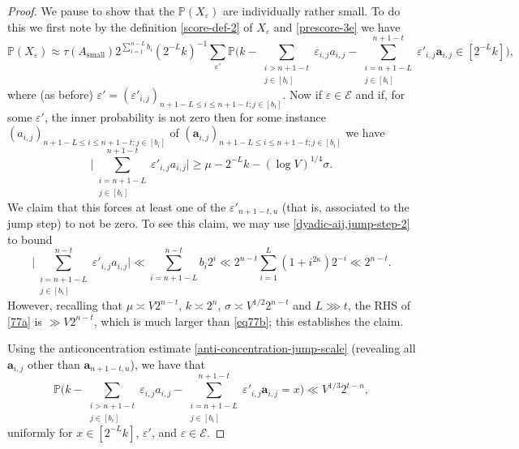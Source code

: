 \documentclass[11pt,reqno]{amsart}
\numberwithin{equation}{section}
\theoremstyle{definition}
\theoremstyle{remark}
\newcommand{\mb}{\mathbb}
\newcommand{\mbf}{\mathbf}
\newcommand{\eps}{\varepsilon}
\renewcommand{\le}{\leqslant}
\renewcommand{\ge}{\geqslant}
\def\sml{\operatorname{small}}
\begin{document}
\begin{proof}
We pause to show that the $\mb{P}(X_{\eps})$ are individually rather small. To do this we first note by the definition \cref{score-def-2} of $X_{\eps}$ and \cref{prescore-3e} we have
\begin{equation}\label{p-eps-eval} \mb{P}(X_{\eps}) \approx \tau(A_{\sml}) 2^{\sum_{i =1}^{n -L}  b_i}(2^{-L}k)^{-1} \sum_{\eps'}  \mb{P} \big(k - \sum_{\substack{i > n + 1 - t \\ j \in [b_i]}} \eps_{i,j} a_{i,j}  - \sum_{\substack{i = n +1 - L\\ j \in [b_i]}}^{n +1 - t} \eps'_{i,j} \mathbf{a}_{i,j}  \in [2^{- L}k] \big),  \end{equation}  where (as before) $\eps'= (\eps'_{i,j})_{n +1 - L \le i \le n + 1 - t;j \in [b_i]}$.  Now if $\eps \in \mathcal{E}$ and if, for some $\eps'$, the inner probability is not zero then for some instance $(a_{i,j})_{n +1 - L \le i \le n +1 - t;j \in [b_i]}$ of $(\mbf{a}_{i,j})_{n +1 - L\le i \le n +1 - t;j \in [b_i]}$ we have
\begin{equation}\label{77a}  \big|\sum_{\substack{i = n +1 - L \\ j \in [b_i]}}^{n +1 - t}\eps'_{i,j} a_{i,j}\big| \ge \mu - 2^{-L} k - (\log V)^{1/4} \sigma.\end{equation}  
We claim that this forces at least one of the $\eps'_{n + 1 - t, u}$ (that is, associated to the jump step) to not be zero. To see this claim, we may use \cref{dyadic-aij,jump-step-2} to bound \begin{equation} \label{eq77b} \big| \sum_{\substack{i = n +1 - L \\ j \in [b_i]}}^{n - t} \eps'_{i,j} a_{i,j}\big| \ll \sum_{i = n +1 - L}^{n - t} b_{i} 2^{i} \ll 2^{n - t} \sum_{i = 1}^L  (1 + i^{2\kappa} )2^{-i} \ll 2^{n - t}.\end{equation} 
However, recalling that $\mu \asymp  V2^{n - t}$, $k \asymp 2^n$, $\sigma \asymp V^{1/2} 2^{n - t}$ and $L \ggg t$, the RHS of \cref{77a} is $\gg V2^{n - t}$, which is much larger than \cref{eq77b}; this establishes the claim.

Using the anticoncentration estimate \cref{anti-concentration-jump-scale} (revealing all $\mbf{a}_{i,j}$ other than $\mathbf{a}_{n + 1 -t,u}$), we have that \[ \mb{P} \Big(k - \sum_{\substack{i > n +1 - t \\ j \in [b_i]}} \eps_{i,j} a_{i,j}  - \sum_{\substack{i = n +1 - L\\ j \in [b_i]}}^{n +1 - t}  \eps'_{i,j} \mathbf{a}_{i,j}  = x\Big) \ll V^{1/3}2^{t - n},\] uniformly for $x \in [2^{-L} k]$, $\eps'$, and $\eps \in \mathcal{E}$.


\end{proof}
\end{document}
